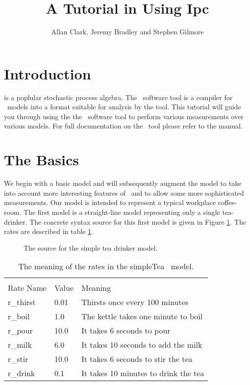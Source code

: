 \documentclass[10pt,a4paper]{article}
\title{A Tutorial in Using Ipc}
\author{
Allan Clark, Jeremy Bradley and Stephen Gilmore
}
\begin{document}
\maketitle

\newcommand{\ipccommandline}[1]{

\noindent
\texttt{#1}
}


\section{Introduction}
\pepa\cite{pepa} is a poplular stochastic process algebra.
The \ipc\ software tool is a compiler for \pepa\ models
into a format suitable for analysis by the \hydra\cite{pepahydra}
tool.
This tutorial will guide you through using the the \ipc\ software
tool to perform various measurements over various models.
For full documentation on the \ipc\ tool please refer to the manual.

\section{The Basics}
We begin with a basic model and will subsequently augment the
model to take into account more interesting features of \pepa\ and to
allow some more sophisticated measurements.
Our model is intended to represent a typical workplace coffee-room.
The first model is a straight-line model representing only a single tea-drinker.
The concrete syntax source for this first model is given in Figure
\ref{figure:pepafile:simpleTea}.
The rates are described in table \ref{table:pepa-rates:simpleTea}.

\begin{figure}[htb]

\caption{
\label{figure:pepafile:simpleTea}
The source for the simple tea drinker model.
}
\end{figure}



\begin{table}[htb]
\begin{tabular}{|l|l|l|}
\hline\\
Rate Name & Value & Meaning\\
\hline
r\_thirst & 0.01 & Thirsts once every 100 minutes\\
\hline
r\_boil  & 1.0 & The kettle takes one minute to boil\\
\hline 
r\_pour  & 10.0 & It takes 6 seconds to pour\\
\hline
r\_milk  & 6.0 & It takes 10 seconds to add the milk\\
\hline
r\_stir  & 10.0 & It takes 6 seconds to stir the tea\\
\hline
r\_drink & 0.1  & It takes 10 minutes to drink the tea\\
\hline
\end{tabular}
\caption{
\label{table:pepa-rates:simpleTea}
The meaning of the rates in the simpleTea \pepa\ model.
}
\end{table}
\end{document}
